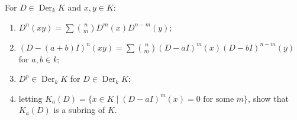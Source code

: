 For $D \in \operatorname{Der}_k K$ and $x, y \in K$:
\begin{enumerate}
  \item[(a)] $D^n(xy) = \sum \binom{n}{m} D^m(x)D^{n-m}(y)$;
  \item[(b)] $(D - (a+b)I)^n(xy) = \sum \binom{n}{m} (D - aI)^m(x)(D - bI)^{n-m}(y)$ for $a, b \in k$;
  \item[(c)] $D^p \in \operatorname{Der}_k K$ for $D \in \operatorname{Der}_k K$;
  \item[(d)] letting $K_a(D) = \{x \in K \mid (D - aI)^m(x) = 0 \text{ for some } m\}$, show that $K_a(D)$ is a subring of $K$.
\end{enumerate}
